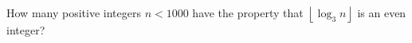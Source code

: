 How many positive integers $n<1000$ have the property that $\left\lfloor\log_3 n\right\rfloor$ is an even integer?

